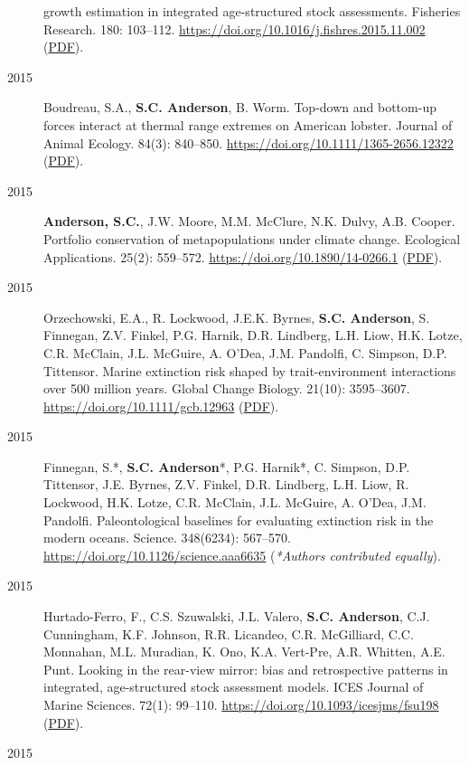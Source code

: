 \begin{description}
growth estimation in integrated age-structured stock assessments.
Fisheries Research. 180: 103--112.
\url{https://doi.org/10.1016/j.fishres.2015.11.002}
(\href{https://www.dropbox.com/s/uksmdtptby9w0ku/Monnahan_etal_2016_binwidth.pdf?dl=1}{PDF}).
\item[2015]
Boudreau, S.A., \textbf{S.C. Anderson}, B. Worm. Top-down and bottom-up
forces interact at thermal range extremes on American lobster. Journal
of Animal Ecology. 84(3): 840--850.
\url{https://doi.org/10.1111/1365-2656.12322}
(\href{https://www.dropbox.com/s/w027swfx2o8hgvl/Boudreau_etal_2015_lobster.pdf?dl=1}{PDF}).
\item[2015]
\textbf{Anderson, S.C.}, J.W. Moore, M.M. McClure, N.K. Dulvy, A.B.
Cooper. Portfolio conservation of metapopulations under climate change.
Ecological Applications. 25(2): 559--572.
\url{https://doi.org/10.1890/14-0266.1}
(\href{https://www.dropbox.com/s/141rsnv5rc7mi5i/Anderson_etal_2015_salmonportfolios.pdf?dl=1}{PDF}).
\item[2015]
Orzechowski, E.A., R. Lockwood, J.E.K. Byrnes, \textbf{S.C. Anderson},
S. Finnegan, Z.V. Finkel, P.G. Harnik, D.R. Lindberg, L.H. Liow, H.K.
Lotze, C.R. McClain, J.L. McGuire, A. O'Dea, J.M. Pandolfi, C. Simpson,
D.P. Tittensor. Marine extinction risk shaped by trait-environment
interactions over 500 million years. Global Change Biology. 21(10):
3595--3607. \url{https://doi.org/10.1111/gcb.12963}
(\href{https://sean.updog.co/papers/Orzechowski_etal_2015_paleometa.pdf}{PDF}).
\item[2015]
Finnegan, S.*, \textbf{S.C. Anderson}*, P.G. Harnik*, C. Simpson, D.P.
Tittensor, J.E. Byrnes, Z.V. Finkel, D.R. Lindberg, L.H. Liow, R.
Lockwood, H.K. Lotze, C.R. McClain, J.L. McGuire, A. O'Dea, J.M.
Pandolfi. Paleontological baselines for evaluating extinction risk in
the modern oceans. Science. 348(6234): 567--570.
\url{https://doi.org/10.1126/science.aaa6635} (\emph{*Authors
contributed equally}).
\item[2015]
Hurtado-Ferro, F., C.S. Szuwalski, J.L. Valero, \textbf{S.C. Anderson},
C.J. Cunningham, K.F. Johnson, R.R. Licandeo, C.R. McGilliard, C.C.
Monnahan, M.L. Muradian, K. Ono, K.A. Vert-Pre, A.R. Whitten, A.E. Punt.
Looking in the rear-view mirror: bias and retrospective patterns in
integrated, age-structured stock assessment models. ICES Journal of
Marine Sciences. 72(1): 99--110.
\url{https://doi.org/10.1093/icesjms/fsu198}
(\href{https://sean.updog.co/papers/Hurtado-Ferro_etal_2014_retrospective.pdf}{PDF}).
\item[2015]

\end{description}
